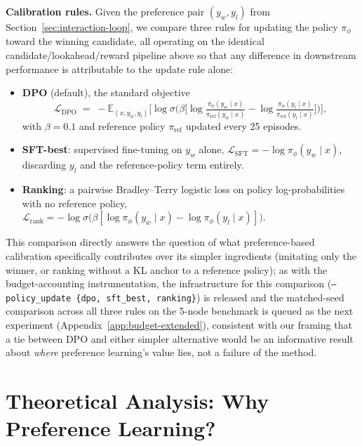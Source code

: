 \documentclass{article}
\theoremstyle{plain}
\theoremstyle{definition}
\theoremstyle{remark}
\begin{document}
\textbf{Calibration rules.} Given the preference pair $(y_w, y_l)$ from Section~\ref{sec:interaction-loop}, we compare three rules for updating the policy $\pi_\phi$ toward the winning candidate, all operating on the identical candidate/lookahead/reward pipeline above so that any difference in downstream performance is attributable to the update rule alone:
\begin{itemize}[leftmargin=1.2em,topsep=0.2em,itemsep=0.1em]
\item \textbf{DPO} (default), the standard objective \citep{rafailov2023direct}
\begin{equation}
\label{eq:dpo-loss}
\mathcal{L}_{\text{DPO}} \;=\; -\mathbb{E}_{(x, y_w, y_l)}\Big[\log\sigma\Big(\beta\big[\log\tfrac{\pi_\phi(y_w \mid x)}{\pi_\text{ref}(y_w \mid x)} - \log\tfrac{\pi_\phi(y_l \mid x)}{\pi_\text{ref}(y_l \mid x)}\big]\Big)\Big],
\end{equation}
with $\beta = 0.1$ and reference policy $\pi_\text{ref}$ updated every 25 episodes.
\item \textbf{SFT-best}: supervised fine-tuning on $y_w$ alone, $\mathcal{L}_{\text{SFT}} = -\log\pi_\phi(y_w \mid x)$, discarding $y_l$ and the reference-policy term entirely.
\item \textbf{Ranking}: a pairwise Bradley--Terry logistic loss on policy log-probabilities with no reference policy, $\mathcal{L}_{\text{rank}} = -\log\sigma\big(\beta[\log\pi_\phi(y_w\mid x) - \log\pi_\phi(y_l\mid x)]\big)$.
\end{itemize}
This comparison directly answers the question of what preference-based calibration specifically contributes over its simpler ingredients (imitating only the winner, or ranking without a KL anchor to a reference policy); as with the budget-accounting instrumentation, the infrastructure for this comparison (\texttt{--policy\_update \{dpo, sft\_best, ranking\}}) is released and the matched-seed comparison across all three rules on the 5-node benchmark is queued as the next experiment (Appendix~\ref{app:budget-extended}), consistent with our framing that a tie between DPO and either simpler alternative would be an informative result about \emph{where} preference learning's value lies, not a failure of the method.

\section{Theoretical Analysis: Why Preference Learning?}
\label{sec:theory}
\end{document}
